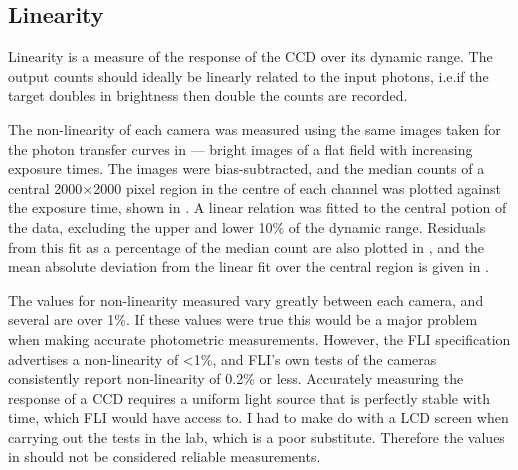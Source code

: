 \subsection{Linearity}
\label{sec:lin}
\begin{colsection}

Linearity is a measure of the response of the CCD over its dynamic range. The output counts should ideally be linearly related to the input photons, i.e.\@ if the target doubles in brightness then double the counts are recorded.

The non-linearity of each camera was measured using the same images taken for the photon transfer curves in  --- bright images of a flat field with increasing exposure times. The images were bias-subtracted, and the median counts of a central 2000$\times$2000 pixel region in the centre of each channel was plotted against the exposure time, shown in . A linear relation was fitted to the central potion of the data, excluding the upper and lower 10\% of the dynamic range. Residuals from this fit as a percentage of the median count are also plotted in , and the mean absolute deviation from the linear fit over the central region is given in .

The values for non-linearity measured vary greatly between each camera, and several are over 1\%. If these values were true this would be a major problem when making accurate photometric measurements. However, the FLI specification advertises a non-linearity of <1\%, and FLI's own tests of the cameras consistently report non-linearity of 0.2\% or less. Accurately measuring the response of a CCD requires a uniform light source that is perfectly stable with time, which FLI would have access to. I had to make do with a LCD screen when carrying out the tests in the lab, which is a poor substitute. Therefore the values in  should not be considered reliable measurements.


\end{colsection}
